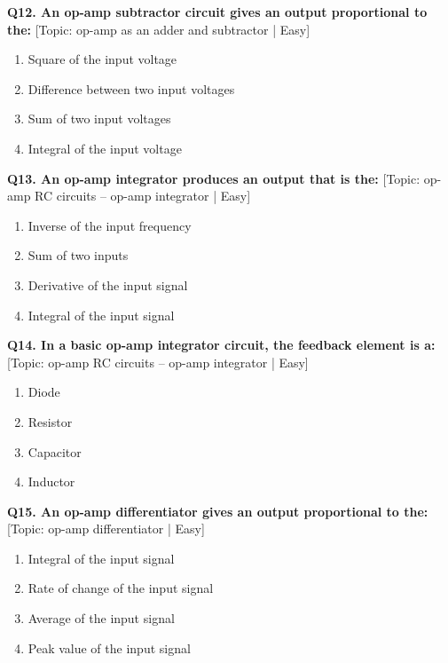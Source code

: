 \noindent\textbf{Q12. An op-amp subtractor circuit gives an output proportional to the:} \hfill [Topic: op-amp as an adder and subtractor | Easy]
\begin{enumerate}[label=(\alph*),topsep=2pt,itemsep=1pt,partopsep=0pt,parsep=0pt]
    \item {Square of the input voltage}
    \item {Difference between two input voltages}
    \item {Sum of two input voltages}
    \item {Integral of the input voltage}
\end{enumerate}
\vspace{2mm}

\noindent\textbf{Q13. An op-amp integrator produces an output that is the:} \hfill [Topic: op-amp RC circuits -- op-amp integrator | Easy]
\begin{enumerate}[label=(\alph*),topsep=2pt,itemsep=1pt,partopsep=0pt,parsep=0pt]
    \item {Inverse of the input frequency}
    \item {Sum of two inputs}
    \item {Derivative of the input signal}
    \item {Integral of the input signal}
\end{enumerate}
\vspace{2mm}

\noindent\textbf{Q14. In a basic op-amp integrator circuit, the feedback element is a:} \hfill [Topic: op-amp RC circuits -- op-amp integrator | Easy]
\begin{enumerate}[label=(\alph*),topsep=2pt,itemsep=1pt,partopsep=0pt,parsep=0pt]
    \item {Diode}
    \item {Resistor}
    \item {Capacitor}
    \item {Inductor}
\end{enumerate}
\vspace{2mm}

\noindent\textbf{Q15. An op-amp differentiator gives an output proportional to the:} \hfill [Topic: op-amp differentiator | Easy]
\begin{enumerate}[label=(\alph*),topsep=2pt,itemsep=1pt,partopsep=0pt,parsep=0pt]
    \item {Integral of the input signal}
    \item {Rate of change of the input signal}
    \item {Average of the input signal}
    \item {Peak value of the input signal}
\end{enumerate}
\vspace{2mm}

